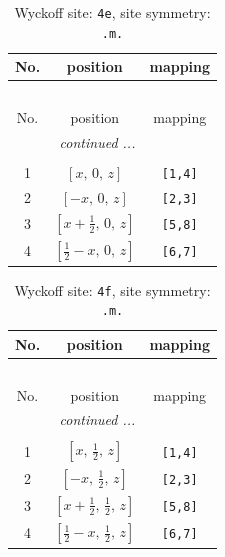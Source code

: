 \documentclass[fleqn,8pt]{jsarticle}
\begin{document}
\begin{longtable}{ccc}
\caption{Wyckoff site: {\tt 4e}, site symmetry: {\tt .m.}}
 \\
 \hline \hline
No. & position & mapping \\ \hline \endfirsthead

\multicolumn{2}{l}{\tablename\ \thetable{}} \\
 \hline \hline
No. & position & mapping \\ \hline \endhead

 \hline \hline
\multicolumn{2}{r}{\footnotesize\it continued ...} \\ \endfoot

 \hline \hline
\multicolumn{2}{r}{} \\ \endlastfoot

1 & $\left[ x,\, 0,\, z \right]$ & {\tt [1,4]} \\ \hline
2 & $\left[ - x,\, 0,\, z \right]$ & {\tt [2,3]} \\ \hline
3 & $\left[ x + \frac{1}{2},\, 0,\, z \right]$ & {\tt [5,8]} \\ \hline
4 & $\left[ \frac{1}{2} - x,\, 0,\, z \right]$ & {\tt [6,7]} \\
\end{longtable}
\renewcommand{\arraystretch}{1.2}
\begin{longtable}{ccc}
\caption{Wyckoff site: {\tt 4f}, site symmetry: {\tt .m.}}
 \\
 \hline \hline
No. & position & mapping \\ \hline \endfirsthead

\multicolumn{2}{l}{\tablename\ \thetable{}} \\
 \hline \hline
No. & position & mapping \\ \hline \endhead

 \hline \hline
\multicolumn{2}{r}{\footnotesize\it continued ...} \\ \endfoot

 \hline \hline
\multicolumn{2}{r}{} \\ \endlastfoot

1 & $\left[ x,\, \frac{1}{2},\, z \right]$ & {\tt [1,4]} \\ \hline
2 & $\left[ - x,\, \frac{1}{2},\, z \right]$ & {\tt [2,3]} \\ \hline
3 & $\left[ x + \frac{1}{2},\, \frac{1}{2},\, z \right]$ & {\tt [5,8]} \\ \hline
4 & $\left[ \frac{1}{2} - x,\, \frac{1}{2},\, z \right]$ & {\tt [6,7]} \\
\end{longtable}
\end{document}
